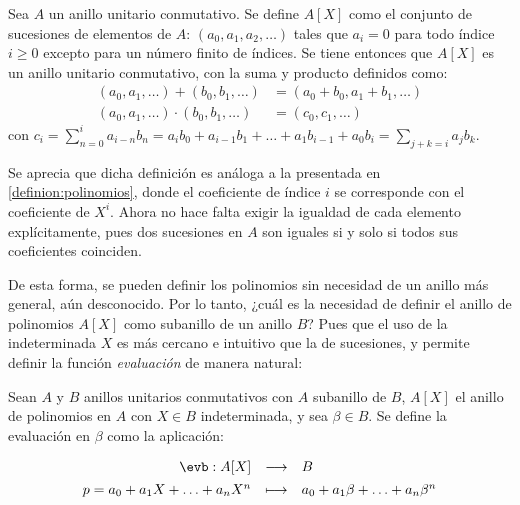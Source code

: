 \begin{deff}{\cite[p.~149]{Hungerford}}\label{definicion:gen_polinomios}
    Sea $A$ un anillo unitario conmutativo. Se define $A[X]$ como el conjunto de sucesiones de elementos de $A$: $(a_0, a_1, a_2, \ldots)$ tales que $a_i = 0$ para todo índice $i\geq 0 $ excepto para un número finito de índices. Se tiene entonces que $A[X]$ es un anillo unitario conmutativo, con la suma y producto definidos como:
    \begin{align*}
        (a_0, a_1, \ldots) + (b_0, b_1, \ldots) &= (a_0 + b_0, a_1 + b_1, \ldots)\\[1ex]
        (a_0, a_1, \ldots) \cdot (b_0, b_1, \ldots) &= (c_0, c_1, \ldots)
    \end{align*}
    con $c_i = \sum\limits_{n=0}^i a_{i-n}b_n = a_ib_0 + a_{i-1}b_1 + \ldots + a_1b_{i-1} + a_0b_i = \sum\limits_{j + k=i} a_jb_k$.
\end{deff}

\begin{obs}
    Se aprecia que dicha definición es análoga a la presentada en \ref{definion:polinomios}, donde el coeficiente de índice $i$ se corresponde con el coeficiente de $X^i$. Ahora no hace falta exigir la igualdad de cada elemento explícitamente, pues dos sucesiones en $A$ son iguales si y solo si todos sus coeficientes coinciden. 
\end{obs}

De esta forma, se pueden definir los polinomios sin necesidad de un anillo más general, aún desconocido. Por lo tanto, ¿cuál es la necesidad de definir el anillo de polinomios $A[X]$ como subanillo de un anillo $B$? Pues que el uso de la indeterminada $X$ es más cercano e intuitivo que la de sucesiones, y permite definir la función \textit{evaluación} de manera natural:

\begin{deff}{\cite[p.~112]{GamboaAnillos}}
    Sean $A$ y $B$ anillos unitarios conmutativos con $A$ subanillo de $B$, $A[X]$ el anillo de polinomios en $A$ con $X\in B$ indeterminada, y sea $\beta \in B$. Se define la evaluación en $\beta$ como la aplicación:
    
    \[
    \begin{array}{rcl}
    \evb : A[X] & \longrightarrow & B \\[1ex]
    p = a_0 + a_1X + \ldots + a_nX^n & \longmapsto & a_0 + a_1\beta + \ldots + a_n\beta^n
    \end{array}
    \]
\end{deff}

